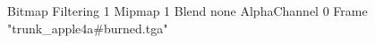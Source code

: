 {Bitmap
	{Filtering 1}
	{Mipmap 1}
	{Blend none}
	{AlphaChannel 0}
	{Frame "trunk_apple4a#burned.tga"}
}
